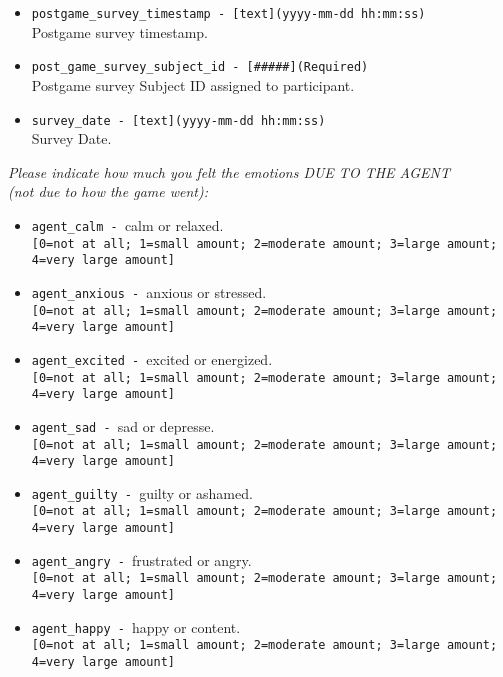 \begin{description}
\begin{addmargin}[0em]{0em}
\begin{addmargin}[1em]{0em}
\begin{itemize}
            \item \verb|postgame_survey_timestamp - [text](yyyy-mm-dd hh:mm:ss)|\\Postgame survey timestamp.
            \item \verb|post_game_survey_subject_id - [#####](Required)|\\Postgame survey Subject ID assigned to participant.
            \item \verb|survey_date - [text](yyyy-mm-dd hh:mm:ss)|\\Survey Date.\\
        \end{itemize}
        \begin{addmargin}[1em]{0em}
            \textit{Please indicate how much you felt the emotions DUE TO THE AGENT\\(not due to how the game went):}
        \end{addmargin}
        \begin{itemize}
            \item \verb|agent_calm - |calm or relaxed.\\\verb|[0=not at all; 1=small amount; 2=moderate amount; 3=large amount; 4=very large amount]|
            \item \verb|agent_anxious - |anxious or stressed.\\\verb|[0=not at all; 1=small amount; 2=moderate amount; 3=large amount; 4=very large amount]|
            \item \verb|agent_excited - |excited or energized.\\\verb|[0=not at all; 1=small amount; 2=moderate amount; 3=large amount; 4=very large amount]|
            \item \verb|agent_sad - |sad or depresse.\\\verb|[0=not at all; 1=small amount; 2=moderate amount; 3=large amount; 4=very large amount]|
            \item \verb|agent_guilty - |guilty or ashamed.\\\verb|[0=not at all; 1=small amount; 2=moderate amount; 3=large amount; 4=very large amount]|
            \item \verb|agent_angry - |frustrated or angry.\\\verb|[0=not at all; 1=small amount; 2=moderate amount; 3=large amount; 4=very large amount]|
            \item \verb|agent_happy - |happy or content.\\\verb|[0=not at all; 1=small amount; 2=moderate amount; 3=large amount; 4=very large amount]|

\end{itemize}
\end{addmargin}
\end{addmargin}
\end{description}
